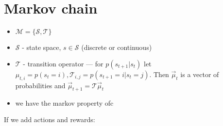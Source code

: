 \documentclass{report}
\begin{document}
\section{Markov chain}
\begin{figure}[htpb]
\begin{center}
\end{center}
\end{figure}
\begin{itemize}
\item $\mathcal{M} = \{\mathcal{S}, \mathcal{T}\}$
\item $\mathcal{S}$ - state space, $s \in \mathcal{S}$ (discrete or continuous)
\item $\mathcal{T}$ - transition operator --- for  $p(s_{t+1} | s_t)$ let 
		$\mu_{t,i} = p(s_t =i), \mathcal{T}_{i,j} = p(s_{t+1} = i  | s_t = j)$. 
		Then $\overrightarrow{\mu}_t$ is a vector of probabilities and 
		$\overrightarrow{\mu}_{t+1} = \mathcal{T} \overrightarrow{\mu}_t$
\item we have the markov property ofc
\end{itemize}
If we add actions and rewards:
\end{document}
